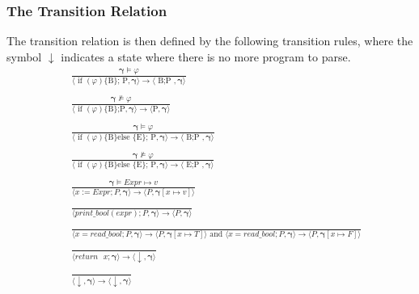 \documentclass{article}
\begin{document}
\subsubsection{The Transition Relation}
The transition relation is then defined by the following transition rules, where the symbol $\downarrow$ indicates a state where there is no more program to parse.
\begin{align*}
    &\; \frac{\mathbf{\gamma} \vDash \varphi}{\langle \text{ if }(\varphi)\text{\{B\}; P}, \mathbf{\gamma} \rangle \rightarrow \langle \text{ B;P }, \mathbf{\gamma} \rangle} \\ \\
    &\; \frac{\mathbf{\gamma} \nvDash \varphi}{\langle \text{ if }(\varphi)\text{\{B\};P}, \mathbf{\gamma} \rangle \rightarrow \langle \text{P}, \mathbf{\gamma} \rangle} \\ \\
    &\; \frac{\mathbf{\gamma} \vDash \varphi}{\langle \text{ if }(\varphi)\text{\{B\} else \{E\}; P}, \mathbf{\gamma} \rangle \rightarrow \langle \text{ B;P }, \mathbf{\gamma} \rangle} \\ \\
    &\; \frac{\mathbf{\gamma} \nvDash \varphi}{\langle \text{ if }(\varphi)\text{\{B\} else \{E\}; P}, \mathbf{\gamma} \rangle \rightarrow \langle \text{ E;P }, \mathbf{\gamma} \rangle} \\ \\
    &\;\frac{\mathbf{\gamma} \vDash Expr \mapsto v}{\langle x:=Expr;P , \mathbf{\gamma} \rangle \rightarrow \langle P,\mathbf{\gamma}[x \mapsto v] \rangle } \\  \\
    &\;\frac{}{\langle print\_bool(expr);P , \mathbf{\gamma}\rangle \rightarrow \langle P, \mathbf{\gamma} \rangle} \\  \\
    &\;\frac{}{\langle x=read\_bool;P , \mathbf{\gamma} \rangle \rightarrow \langle P,\mathbf{\gamma}[x \mapsto T] \rangle \text{ and } \langle x=read\_bool;P , \mathbf{\gamma} \rangle \rightarrow \langle P,\mathbf{\gamma}[x \mapsto F] \rangle}\\ \\
    &\;\frac{}{\langle return \text{ } x; \mathbf{\gamma} \rangle \rightarrow \langle \downarrow, \mathbf{\gamma} \rangle} \\ \\
    &\;\frac{}{\langle \downarrow, \mathbf{\gamma} \rangle \rightarrow \langle \downarrow, \mathbf{\gamma} \rangle} \\
\end{align*}
\end{document}
